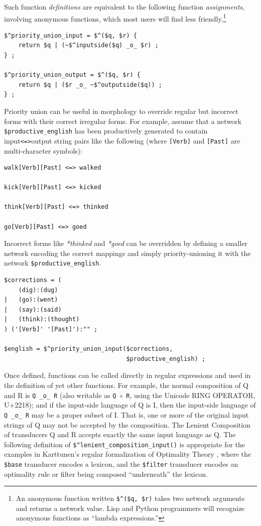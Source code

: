 \documentclass[letterpaper,12pt]{article}
\begin{document}
\noindent
Such function \emph{definitions} are equivalent to the following function
\emph{assignments}, involving anonymous functions, which most users will find less
friendly.\footnote{An anonymous function written \verb!$^($q, $r)! takes two network
arguments and returns a network value.  Lisp and Python programmers
will recognize anonymous functions as ``lambda expressions.''}

\begin{Verbatim}[fontsize=\small]
$^priority_union_input = $^($q, $r) {
	return $q | (~$^inputside($q) _o_ $r) ;
} ;

$^priority_union_output = $^($q, $r) {
	return $q | ($r _o_ ~$^outputside($q)) ;
} ;
\end{Verbatim}

Priority union can be useful in morphology to override regular but incorrect
forms with their correct irregular forms.  For example, assume that
a network \verb!$productive_english! has been productively generated to contain
input\verb!<=>!output
string pairs like the following (where \verb![Verb]! and \verb![Past]! are
multi-character symbols):

\begin{Verbatim}[fontsize=\small]
walk[Verb][Past] <=> walked

kick[Verb][Past] <=> kicked

think[Verb][Past] <=> thinked

go[Verb][Past] <=> goed
\end{Verbatim}

\noindent
Incorrect forms like \emph{*thinked} and \emph{*goed} can be overridden by 
defining a
smaller network encoding the correct mappings and simply priority-unioning it with
the network \verb!$productive_english!.

\begin{Verbatim}[fontsize=\small]
$corrections = (
    (dig):(dug)
|   (go):(went)
|   (say):(said)
|   (think):(thought)
) ('[Verb]' '[Past]'):"" ;

$english = $^priority_union_input($corrections, 
                                  $productive_english) ;
\end{Verbatim}


Once defined, functions can be called directly in regular
expressions and used in the definition of yet other functions.  For
example, the normal composition of Q and R 
is \verb!Q _o_ R! (also writable as \verb!Q!~$\circ$~\verb!R!, using the
Unicode RING OPERATOR, U+2218); and if the input-side language of Q is I, then
the input-side language of \verb!Q _o_ R! may be a proper subset of I.
That is, one or more of the original input strings of Q may not be accepted by the 
composition.  The Lenient Composition of transducers Q and R accepts exactly the 
same input language as Q.  The
following definition of \verb!$^lenient_composition_input()! is
appropriate for the examples in Karttunen's regular formalization of Optimality Theory
\cite{karttunen:1998}, where the \verb!$base!
transducer encodes a lexicon, and the \verb!$filter! transducer
encodes an optimality rule or filter being composed
``underneath''
the lexicon.
\end{document}
